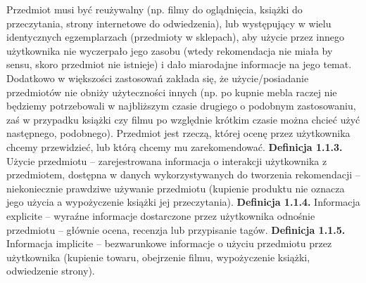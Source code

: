 \documentclass{pracamgr}
\begin{document}
    Przedmiot musi być reużywalny (np. filmy do oglądnięcia, książki do przeczytania, strony internetowe do odwiedzenia),
    lub występujący w wielu identycznych egzemplarzach (przedmioty w sklepach), aby użycie przez innego użytkownika nie wyczerpało jego zasobu
    (wtedy rekomendacja nie miała by sensu, skoro przedmiot nie istnieje) i dało miarodajne informacje na jego temat.
    Dodatkowo w większości zastosowań zakłada się, że użycie/posiadanie przedmiotów nie obniży użyteczności innych
    (np. po kupnie mebla raczej nie będziemy potrzebowali w najbliższym czasie drugiego o podobnym zastosowaniu,
    zaś w przypadku książki czy filmu po względnie krótkim czasie można chcieć użyć następnego, podobnego).\newline
    Przedmiot jest rzeczą, której ocenę przez użytkownika chcemy przewidzieć, lub którą chcemy mu zarekomendować.\newline\newline
   \textbf{Definicja 1.1.3.} Użycie przedmiotu -- zarejestrowana informacja o interakcji użytkownika z przedmiotem,
   dostępna w danych wykorzystywanych do tworzenia rekomendacji -- niekoniecznie prawdziwe używanie przedmiotu
   (kupienie produktu nie oznacza jego użycia a wypożyczenie książki jej przeczytania). \newline\newline
   \textbf{Definicja 1.1.4.} Informacja explicite -- wyraźne informacje dostarczone przez użytkownika odnośnie przedmiotu -- głównie
    ocena, recenzja lub przypisanie tagów.\newline\newline
   \textbf{Definicja 1.1.5.} Informacja implicite -- bezwarunkowe informacje o użyciu przedmiotu przez użytkownika
    (kupienie towaru, obejrzenie filmu, wypożyczenie książki, odwiedzenie strony).\newline
    
\end{document}
